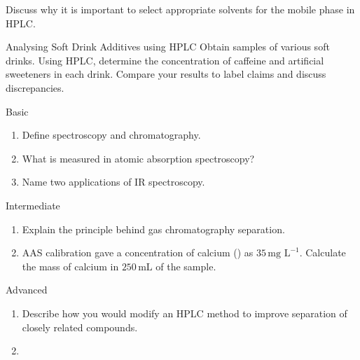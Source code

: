 \begin{marginfigure}[0pt][0pt][0pt]
\caption{HPLC chromatogram showing different components.}
\label{fig:hplc-chromatogram}
\end{marginfigure}

\begin{stopandthink}
Discuss why it is important to select appropriate solvents for the mobile phase in HPLC.
\end{stopandthink}

\FloatBarrier

\begin{investigation}{Analysing Soft Drink Additives using HPLC}
Obtain samples of various soft drinks. Using HPLC, determine the concentration of caffeine and artificial sweeteners in each drink. Compare your results to label claims and discuss discrepancies.
\end{investigation}

\begin{tieredquestions}{Basic}
\begin{enumerate}
    \item Define spectroscopy and chromatography.
    \item What is measured in atomic absorption spectroscopy?
    \item Name two applications of IR spectroscopy.
\end{enumerate}
\end{tieredquestions}

\begin{tieredquestions}{Intermediate}
\begin{enumerate}
    \item Explain the principle behind gas chromatography separation.
    \item AAS calibration gave a concentration of calcium () as $35\,\text{mg L}^{-1}$. Calculate the mass of calcium in $250\,\text{mL}$ of the sample.
\end{enumerate}
\end{tieredquestions}

\begin{tieredquestions}{Advanced}
\begin{enumerate}
    \item Describe how you would modify an HPLC method to improve separation of closely related compounds.
    \item {}
\end{enumerate}
\end{tieredquestions}


